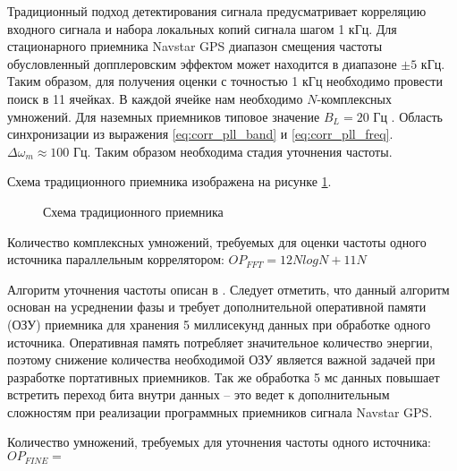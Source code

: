 Традиционный подход детектирования сигнала предусматривает корреляцию входного сигнала и набора локальных копий сигнала шагом 1 кГц.
Для стационарного приемника Navstar GPS диапазон смещения частоты обусловленный допплеровским эффектом \cite{tsui} может находится в диапазоне ${\pm 5}$ кГц.
Таким образом, для получения оценки с точностью 1 кГц необходимо провести поиск в 11 ячейках. В каждой ячейке нам необходимо ${N}$-комплексных умножений.
Для наземных приемников типовое значение  ${B_L=20}$ Гц \cite{tsui, akos-book}. Область синхронизации из выражения \ref{eq:corr_pll_band} и  \ref{eq:corr_pll_freq}.
${\Delta \omega_m \approx 100}$ Гц. Таким образом необходима стадия уточнения частоты.

Схема традиционного приемника изображена на рисунке \ref{pic:corr_scheme}.
\begin{figure}[H]
	\center{}
	\caption{Схема традиционного приемника}
	\label{pic:corr_scheme}
\end{figure}

Количество комплексных умножений, требуемых для оценки частоты одного источника параллельным коррелятором: ${OP_{FFT} = 12NlogN + 11N}$

Алгоритм уточнения частоты описан в \cite{tsui}. Следует отметить, что данный алгоритм основан на усреднении фазы и требует дополнительной оперативной памяти
(ОЗУ) приемника для хранения 5 миллисекунд данных при обработке одного источника. Оперативная память потребляет значительное количество энергии,
поэтому снижение количества необходимой ОЗУ является важной задачей при разработке портативных приемников.
Так же обработка 5 мс данных повышает встретить переход бита внутри данных – это ведет к дополнительным сложностям при реализации программных приемников сигнала Navstar GPS.

Количество умножений, требуемых для уточнения частоты одного источника: ${OP_{FINE} = }$

\newpage
